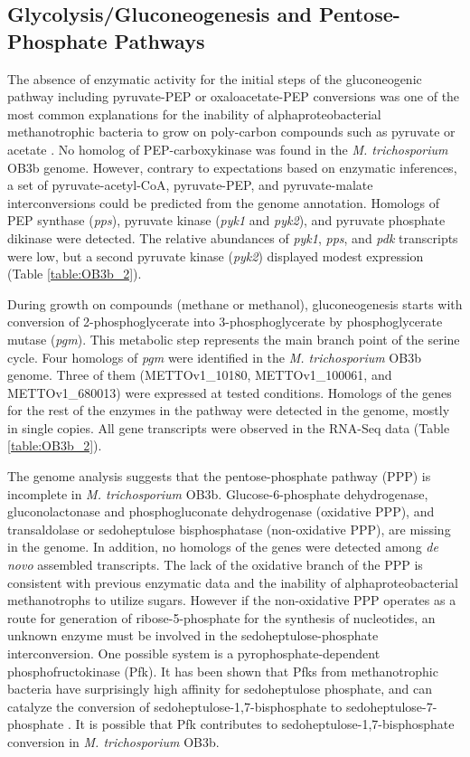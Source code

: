 \subsection{Glycolysis/Gluconeogenesis and Pentose-Phosphate Pathways}
The absence of enzymatic activity for the initial steps of the gluconeogenic pathway including pyruvate-PEP or oxaloacetate-PEP conversions was one of the most common explanations for the inability of alphaproteobacterial methanotrophic bacteria to grow on poly-carbon compounds such as pyruvate or acetate \cite{patel1979, shishkina1982}.
No homolog of PEP-carboxykinase was found in the \textit{M. trichosporium} OB3b genome.
However, contrary to expectations based on enzymatic inferences, a set of pyruvate-acetyl-CoA, pyruvate-PEP, and pyruvate-malate interconversions could be predicted from the genome annotation.
Homologs of PEP synthase (\textit{pps}), pyruvate kinase (\textit{pyk1} and \textit{pyk2}), and pyruvate phosphate dikinase were detected.
The relative abundances of \textit{pyk1}, \textit{pps}, and \textit{pdk} transcripts were low, but a second pyruvate kinase (\textit{pyk2}) displayed modest expression (Table \ref{table:OB3b_2}).

During growth on  compounds (methane or methanol), gluconeogenesis starts with conversion of 2-phosphoglycerate into 3-phosphoglycerate by phosphoglycerate mutase (\textit{pgm}).
This metabolic step represents the main branch point of the serine cycle.
Four homologs of \textit{pgm} were identified in the \textit{M. trichosporium} OB3b genome.
Three of them (METTOv1\_10180, METTOv1\_100061, and METTOv1\_680013) were expressed at tested conditions.
Homologs of the genes for the rest of the enzymes in the pathway were detected in the genome, mostly in single copies.
All gene transcripts were observed in the RNA-Seq data (Table \ref{table:OB3b_2}).

The genome analysis suggests that the pentose-phosphate pathway (PPP) is incomplete in \textit{M. trichosporium} OB3b.
Glucose-6-phosphate dehydrogenase, gluconolactonase and phosphogluconate dehydrogenase (oxidative PPP), and transaldolase or sedoheptulose bisphosphatase (non-oxidative PPP), are missing in the genome.
In addition, no homologs of the genes were detected among \textit{de novo} assembled transcripts.
The lack of the oxidative branch of the PPP is consistent with previous enzymatic data and the inability of alphaproteobacterial methanotrophs to utilize sugars.
However if the non-oxidative PPP operates as a route for generation of ribose-5-phosphate for the synthesis of nucleotides, an unknown enzyme must be involved in the sedoheptulose-phosphate interconversion.
One possible system is a pyrophosphate-dependent phosphofructokinase (Pfk).
It has been shown that Pfks from methanotrophic bacteria have surprisingly high affinity for sedoheptulose phosphate, and can catalyze the conversion of sedoheptulose-1,7-bisphosphate to sedoheptulose-7-phosphate \cite{reshetnikov2008, rozova2012}.
It is possible that Pfk contributes to sedoheptulose-1,7-bisphosphate conversion in \textit{M. trichosporium} OB3b.

